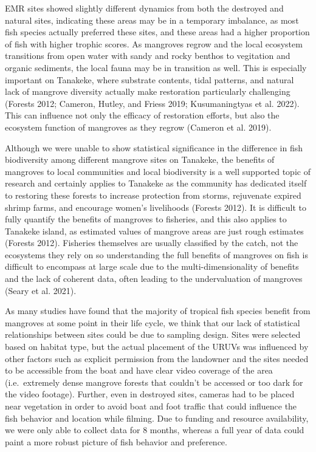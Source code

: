 \documentclass[
]{article}
\begin{document}
EMR sites showed slightly different dynamics from both the destroyed and natural sites, indicating these areas may be in a temporary imbalance, as most fish species actually preferred these sites, and these areas had a higher proportion of fish with higher trophic scores. As mangroves regrow and the local ecosystem transitions from open water with sandy and rocky benthos to vegitation and organic sediments, the local fauna may be in transition as well. This is especially important on Tanakeke, where substrate contents, tidal patterns, and natural lack of mangrove diversity actually make restoration particularly challenging (Forests 2012; Cameron, Hutley, and Friess 2019; Kusumaningtyas et al. 2022). This can influence not only the efficacy of restoration efforts, but also the ecosystem function of mangroves as they regrow (Cameron et al. 2019).

Although we were unable to show statistical significance in the difference in fish biodiversity among different mangrove sites on Tanakeke, the benefits of mangroves to local communities and local biodiversity is a well supported topic of research and certainly applies to Tanakeke as the community has dedicated itself to restoring these forests to increase protection from storms, rejuvenate expired shrimp farms, and encourage women's livelihoods (Forests 2012). It is difficult to fully quantify the benefits of mangroves to fisheries, and this also applies to Tanakeke island, as estimated values of mangrove areas are just rough estimates (Forests 2012). Fisheries themselves are usually classified by the catch, not the ecosystems they rely on so understanding the full benefits of mangroves on fish is difficult to encompass at large scale due to the multi-dimensionality of benefits and the lack of coherent data, often leading to the undervaluation of mangroves (Seary et al. 2021).

As many studies have found that the majority of tropical fish species benefit from mangroves at some point in their life cycle, we think that our lack of statistical relationships between sites could be due to sampling design. Sites were selected based on habitat type, but the actual placement of the URUVs was influenced by other factors such as explicit permission from the landowner and the sites needed to be accessible from the boat and have clear video coverage of the area (i.e.~extremely dense mangrove forests that couldn't be accessed or too dark for the video footage). Further, even in destroyed sites, cameras had to be placed near vegetation in order to avoid boat and foot traffic that could influence the fish behavior and location while filming. Due to funding and resource availability, we were only able to collect data for 8 months, whereas a full year of data could paint a more robust picture of fish behavior and preference.
\end{document}
